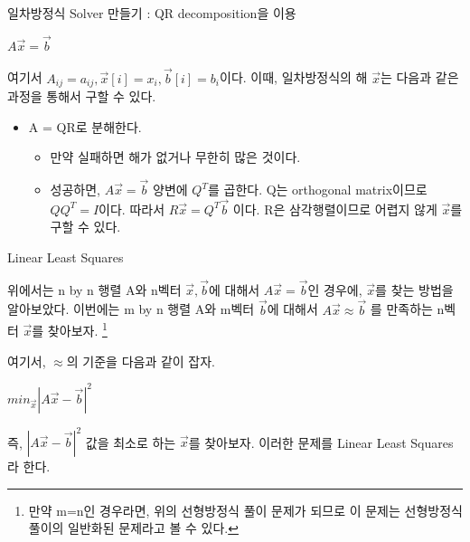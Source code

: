 \documentclass{beamer}
\begin{document}
\begin{frame}{일차방정식 Solver 만들기 : QR decomposition을 이용} 

$A\vec{x} = \vec{b}$

여기서 $A_{ij} = a_{ij}, \vec{x}[i] = x_i, \vec{b}[i] = b_i$이다. 이때, 일차방정식의 해 $\vec{x}$는 다음과 같은 과정을 통해서 구할 수 있다. 

\begin{itemize} 
\item A = QR로 분해한다.  
\begin{itemize} 
\item 만약 실패하면 해가 없거나 무한히 많은 것이다. 
\item 성공하면, $A\vec{x} =\vec{b}$ 양변에 $Q^T$를 곱한다. Q는 orthogonal matrix이므로 $QQ^T=I$이다. 따라서 $R\vec{x} = Q^T\vec{b}$ 이다. R은 삼각행렬이므로 어렵지 않게 $\vec{x}$를 구할 수 있다. 
\end{itemize}
\end{itemize}
\end{frame}






\begin{frame}{Linear Least Squares} 

위에서는 n by n 행렬 A와 n벡터 $\vec{x}, \vec{b}$에 대해서 $A\vec{x} = \vec{b}$인 경우에, $\vec{x}$를 찾는 방법을 알아보았다. 이번에는 m by n 행렬 A와 m벡터 $\vec{b}$에 대해서 $A\vec{x} \approx \vec{b}$ 를 만족하는 n벡터 $\vec{x}$를 찾아보자. \footnote{만약 m=n인 경우라면, 위의 선형방정식 풀이 문제가 되므로 이 문제는 선형방정식 풀이의 일반화된 문제라고 볼 수 있다.} 

여기서, $\approx$의 기준을 다음과 같이 잡자. 

\vspace{5mm}

$ min_{\vec{x}} |A\vec{x} - \vec{b}|^2 $ 

\vspace{5mm}

즉, $|A\vec{x} - \vec{b}|^2 $ 값을 최소로 하는 $\vec{x}$를 찾아보자. 
\vspace{5mm}
이러한 문제를 Linear Least Squares라 한다. 

\end{frame}
\end{document}
